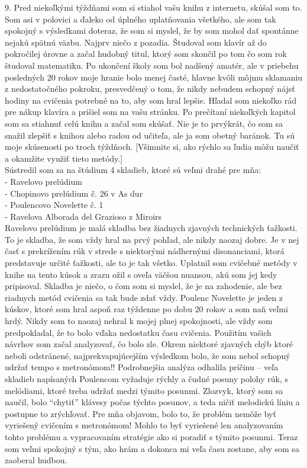 9. Pred niekoľkými týždňami som si stiahol vašu knihu z internetu, skúšal som to. Som asi v polovici a ďaleko od úplného uplatňovania všetkého, ale som tak spokojný s výsledkami doteraz, že som si myslel, že by som mohol dať spontánne nejakú spätnú väzbu.
Najprv niečo z pozadia. Študoval som klavír až do pokročilej úrovne a začal hudobný titul, ktorý som skončil po tom čo som rok študoval matematiku. Po ukončení školy som bol nadšený amatér, ale v priebehu posledných 20 rokov moje hranie bolo menej časté, hlavne kvôli môjmu sklamaniu z nedostatočného pokroku, presvedčený o tom, že nikdy nebudem schopný nájsť hodiny na cvičenia potrebné na to, aby som hral lepšie. Hľadal som niekoľko rád pre nákup klavíra a prišiel som na vašu stránku. Po prečítaní niekoľkých kapitol som sa stiahnuť celú knihu a začal som skúšať. Nie je to prvýkrát, čo som sa snažil zlepšiť s knihou alebo radou od učiteľa, ale ja som obetný baránok. Tu sú moje skúsenosti po troch týždňoch. [Všimnite si, ako rýchlo sa ľudia môžu naučiť a okamžite využiť tieto metódy.]\\
Sústredil som sa na štúdium 4 skladieb, ktoré sú veľmi drahé pre mňa:\\
- Ravelovo prelúdium\\
- Chopinovo prelúdium č. 26 v As dur\\
- Poulencovo Novelette č. 1\\
- Ravelova Alborada del Grazioso z Miroirs\\
Ravelovo prelúdium je malá skladba bez žiadnych zjavných technických ťažkosti. To je skladba, že som vždy hral na prvý pohľad, ale nikdy naozaj dobre. Je v nej časť s prekrížením rúk v strede s niektorými nádhernými disonanciami, ktorá predstavuje určité ťažkosti, ale to je tak všetko. Uplatnil som cvičebné metódy v knihe na tento kúsok a zrazu ožil s oveľa väčšou nuansou, akú som jej kedy pripisoval. Skladba je niečo, o čom som si myslel, že je na zahodenie, ale bez riadnych metód cvičenia sa tak bude zdať vždy.
Poulenc Novelette je jeden z kúskov, ktoré som hral aspoň raz týždenne po dobu 20 rokov a som  naň veľmi hrdý. Nikdy som to naozaj nehral k mojej plnej spokojnosti, ale vždy som predpokladal, že to bolo vďaka nedostatku času cvičenia. Použitím vašich návrhov som začal analyzovať, čo bolo zle. Okrem niektoré zjavných chýb ktoré neboli odstránené, najprekvapujúcejším výsledkom bolo, že som nebol schopný udržať tempo s metronómom!! Podrobnejšia analýza odhalila príčinu – veľa skladieb napísaných Poulencom vyžaduje rýchly a čudné posuny polohy rúk, s melódiami, ktoré treba udržať medzi týmito posunmi. Zlozvyk, ktorý som sa naučil, bolo “chytiť” klávesy počas týchto posunov, a teda ničiť melodickú líniu a postupne to zrýchľovať. Pre mňa objavom, bolo to, že problém nemôže byť vyriešený cvičením s metronómom! Mohlo to byť vyriešené len analyzovaním tohto problému a vypracovaním stratégie ako si poradiť s týmito posunmi. Teraz som veľmi spokojný s tým, ako hrám a dokonca mi veľa času zostane, aby som sa zaoberal hudbou.
